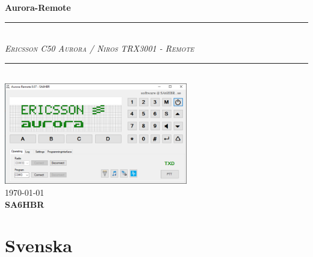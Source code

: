 \documentclass[a4paper]{article}
\begin{document}
\begin{titlepage}
\vspace*{100px}
\newcommand{\HRule}{\rule{\linewidth}{0.5mm}} 	
\center 
 
{ \huge \bfseries Aurora-Remote}
\vspace*{50px}

\HRule \\[0.8cm]

\textsc{\normalsize \emph {Ericsson C50 Aurora / Niros TRX3001 - Remote}}\\[0.8cm]

\HRule \\[1cm]

\includegraphics[width=0.6\textwidth]{../image/AuroraRemote.png}\\[3cm] 

{\large \today}\\[2cm]
\textsc{ \huge \bfseries SA6HBR}\\[1cm]

\vfill 
\end{titlepage}

\pagestyle{fancy}
\fancyhf{}
\lhead{\today}

\cfoot{ \thepage}



\section*{Svenska}
\end{document}
